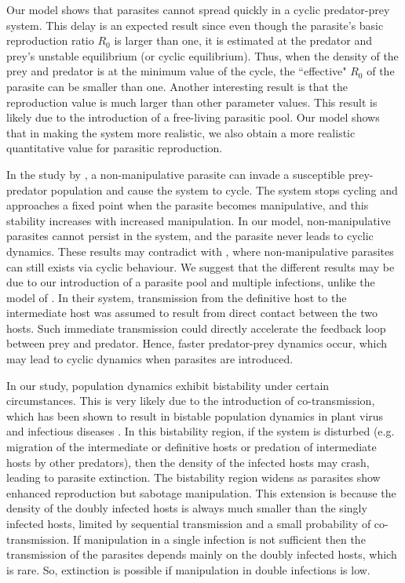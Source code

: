 \documentclass[a4paper]{scrartcl}
\begin{document}
Our model shows that parasites cannot spread quickly in a cyclic predator-prey system. 
This delay is an expected result since even though the parasite's basic reproduction ratio $R_0$ is larger than one, it is estimated at the predator and prey's unstable equilibrium (or cyclic equilibrium). 
Thus, when the density of the prey and predator is at the minimum value of the cycle, the ``effective" $R_0$ of the parasite can be smaller than one. 
Another interesting result is that the reproduction value is much larger than other parameter values.
This result is likely due to the introduction of a free-living parasitic pool. Our model shows that in making the system more realistic, we also obtain a more realistic quantitative value for parasitic reproduction.

In the study by \cite{Rogawa2018}, a non-manipulative parasite can invade a susceptible prey-predator population and cause the system to cycle. 
The system stops cycling and approaches a fixed point when the parasite becomes manipulative, and this stability increases with increased manipulation.
In our model, non-manipulative parasites cannot persist in the system, and the parasite never leads to cyclic dynamics. 
These results may contradict with \cite{Rogawa2018}, where non-manipulative parasites can still exists via cyclic behaviour. 
We suggest that the different results may be due to our introduction of a parasite pool and multiple infections, unlike the model of \cite{Rogawa2018}. 
In their system, transmission from the definitive host to the intermediate host was assumed to result from direct contact between the two hosts. 
Such immediate transmission could directly accelerate the feedback loop between prey and predator. 
Hence, faster predator-prey dynamics occur, which may lead to cyclic dynamics when parasites are introduced.

In our study, population dynamics exhibit bistability under certain circumstances. 
This is very likely due to the introduction of co-transmission, which has been shown to result in bistable population dynamics in plant virus \cite{allen_modelling_2019} and infectious diseases \cite{gao_coinfection_2016-1}.
 In this bistability region, if the system is disturbed (e.g. migration of the intermediate or definitive hosts or predation of intermediate hosts by other predators), then the density of the infected hosts may crash, leading to parasite extinction. 
The bistability region widens as parasites show enhanced reproduction but sabotage manipulation. 
This extension is because the density of the doubly infected hosts is always much smaller than the singly infected hosts, limited by sequential transmission and a small probability of co-transmission. 
If manipulation in a single infection is not sufficient then the transmission of the parasites depends mainly on the doubly infected hosts, which is rare. 
So, extinction is possible if manipulation in double infections is low.
\end{document}

